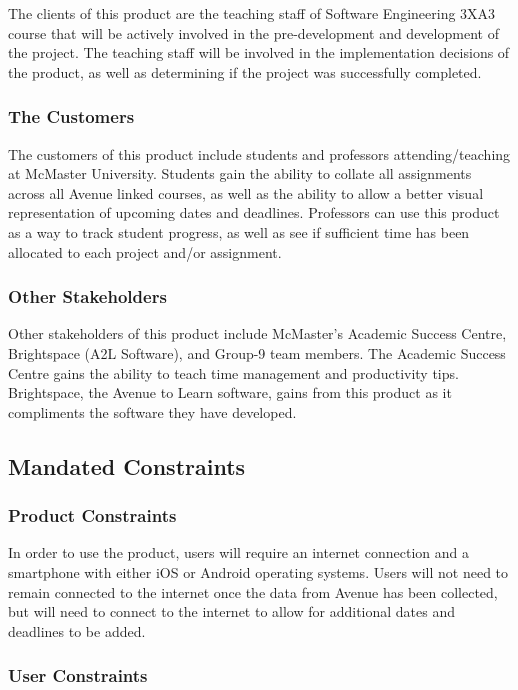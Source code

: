 \documentclass[12pt, titlepage]{article}
\begin{document}
The clients of this product are the teaching staff of Software Engineering 3XA3 course that will be actively involved in the pre-development and development of the project. The teaching staff will be involved in the implementation decisions of the product, as well as determining if the project was successfully completed.

\subsubsection{The Customers}

The customers of this product include students and professors attending/teaching at McMaster University. Students gain the ability to collate all assignments across all Avenue linked courses, as well as the ability to allow a better visual representation of upcoming dates and deadlines. Professors can use this product as a way to track student progress, as well as see if sufficient time has been allocated to each project and/or assignment.

\subsubsection{Other Stakeholders}

Other stakeholders of this product include McMaster’s Academic Success Centre, Brightspace (A2L Software), and Group-9 team members. The Academic Success Centre gains the ability to teach time management and productivity tips. Brightspace, the Avenue to Learn software, gains from this product as it compliments the software they have developed.

\subsection{Mandated Constraints}

\subsubsection{Product Constraints}

In order to use the product, users will require an internet connection and a smartphone with either iOS or Android operating systems. Users will not need to remain connected to the internet once the data from Avenue has been collected, but will need to connect to the internet to allow for additional dates and deadlines to be added.

\subsubsection{User Constraints}
\end{document}
